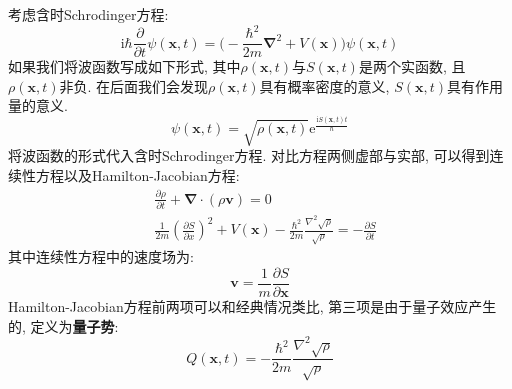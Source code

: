         考虑含时Schrodinger方程: 
        \begin{equation}
            \mathrm{i}\hbar \frac {\partial}{\partial t} \psi(\bm{x},t) = \bigg( - \frac {\hbar^2}{2m}\bm{\nabla}^2 + V(\bm{x})\bigg) \psi(\bm{x},t)
        \end{equation}
        如果我们将波函数写成如下形式, 其中$\rho(\bm{x},t)$与$S(\bm{x},t)$是两个实函数, 且$\rho(\bm{x},t)$非负. 在后面我们会发现$\rho(\bm{x},t)$具有概率密度的意义, $S(\bm{x},t)$具有作用量的意义. 
        \begin{equation}
            \psi(\bm{x},t) = \sqrt{\rho(\bm{x},t)} \mathrm{e}^{\frac {\mathrm{i}S(\bm{x},t)t}{\hbar}}
        \end{equation}
        将波函数的形式代入含时Schrodinger方程. 对比方程两侧虚部与实部, 可以得到连续性方程以及Hamilton-Jacobian方程: 
        \begin{equation}\begin{aligned}
            &\frac {\partial \rho}{\partial t} + \bm{\nabla} \cdot (\rho \bm{v}) = 0 \\
            &\frac {1}{2m} \left(\frac {\partial S}{\partial x} \right)^2 + V(\bm{x}) - \frac {\hbar^2}{2m} \frac {\nabla^2 \sqrt{\rho}}{\sqrt{\rho}} = -\frac {\partial S}{\partial t}
        \end{aligned}\end{equation}
        其中连续性方程中的速度场为: 
        \begin{equation}
            \bm{v} = \frac 1m \frac {\partial S}{\partial \bm{x}}
        \end{equation}
        Hamilton-Jacobian方程前两项可以和经典情况类比, 第三项是由于量子效应产生的, 定义为\textbf{量子势}: 
        \begin{equation}
            Q(\bm{x},t) = - \frac {\hbar^2}{2m} \frac {\nabla^2 \sqrt{\rho}}{\sqrt{\rho}}
        \end{equation}

